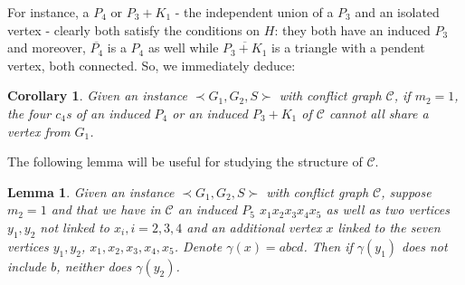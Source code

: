 \documentclass[final]{dmtcs-episciences}
\newtheorem{lemma}[theorem]{Lemma}
\newtheorem{corollary}[theorem]{Corollary}
\begin{document}
For instance, a $P_4$ or $P_3+K_1$ \-- the independent union of a $P_3$ and an isolated vertex \-- clearly both satisfy the conditions on $H$: they both have an induced $P_3$ and moreover, $\overline{P_4}$ is a $P_4$ as well while $\overline{P_3+K_1}$ is a triangle with a pendent vertex, both connected. So, we immediately deduce:

\begin{corollary}
\label{lem_P4}
Given an instance $\prec G_1,G_2,S \succ$ with conflict graph $\mathcal{C}$, if $m_2=1$, the four $c_4$s of an induced $P_4$ or an induced $P_3+K_1$ of $\mathcal{C}$ 
cannot all share a vertex from $G_1$.
\end{corollary}


The following lemma will be useful for studying the structure of $\mathcal{C}$.

\begin{lemma}\label{lem:5nodes}
Given an instance $\prec G_1,G_2,S \succ$ with conflict graph $\mathcal{C}$, suppose $m_2=1$ and that  we have in $\mathcal{C}$ an induced $P_5$ $x_1x_2x_3x_4x_5$ as well as two vertices $y_1,y_2$ not linked to $x_i, i=2,3,4$ and an additional vertex  $x$ linked to the seven vertices $y_1,y_2$, $x_1,x_2,x_3,x_4, x_5$. Denote $\gamma(x)=abcd$.
Then if $\gamma(y_1)$ does not include $b$, neither does $\gamma(y_2)$. 
\end{lemma}
\end{document}
